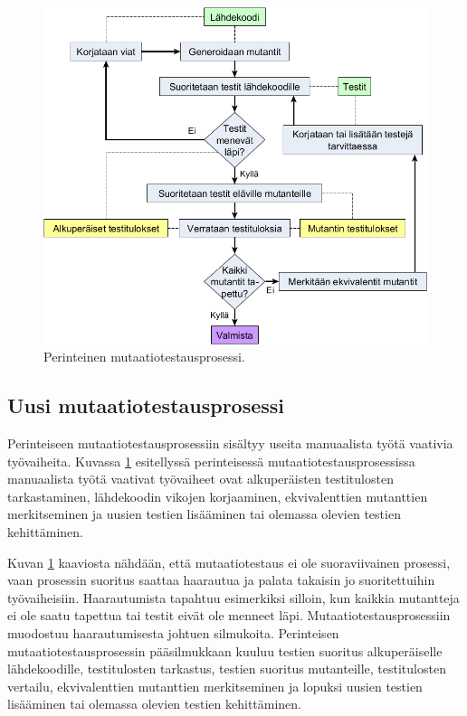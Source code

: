 \documentclass[finnish, grading]{tktltiki2}
\theoremstyle{definition}
\theoremstyle{remark}
\begin{document}
\begin{figure}[H]
	\centering
		\includegraphics[width=\textwidth]{mutaatiotestausprosessi3}
	\caption{Perinteinen mutaatiotestausprosessi.}
	\label{figure:Mutaatiotestausprosessi}
\end{figure}

\subsection{Uusi mutaatiotestausprosessi}

Perinteiseen mutaatiotestausprosessiin sisältyy useita manuaalista työtä vaativia työvaiheita. Kuvassa \ref{figure:Mutaatiotestausprosessi} esitellyssä perinteisessä mutaatiotestausprosessissa manuaalista työtä vaativat työvaiheet ovat alkuperäisten testitulosten tarkastaminen, lähdekoodin vikojen korjaaminen, ekvivalenttien mutanttien merkitseminen ja uusien testien lisääminen tai olemassa olevien testien kehittäminen. 

Kuvan \ref{figure:Mutaatiotestausprosessi} kaaviosta nähdään, että mutaatiotestaus ei ole suoraviivainen prosessi, vaan prosessin suoritus saattaa haarautua ja palata takaisin jo suoritettuihin työvaiheisiin. Haarautumista tapahtuu esimerkiksi silloin, kun kaikkia mutantteja ei ole saatu tapettua tai testit eivät ole menneet läpi. Mutaatiotestausprosessiin muodostuu haarautumisesta johtuen silmukoita. Perinteisen mutaatiotestausprosessin pääsilmukkaan kuuluu testien suoritus alkuperäiselle lähdekoodille, testitulosten tarkastus, testien suoritus mutanteille, testitulosten vertailu, ekvivalenttien mutanttien merkitseminen ja lopuksi uusien testien lisääminen tai olemassa olevien testien kehittäminen.
\end{document}
